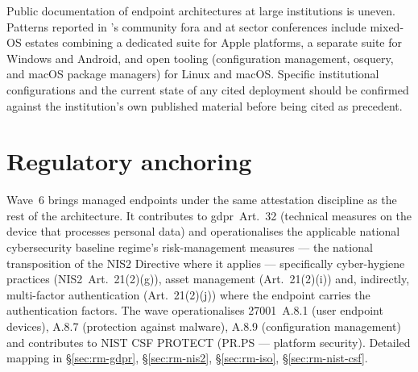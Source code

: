 \begin{realworldbox}
\noindent Public documentation of endpoint architectures at
large institutions is uneven. Patterns reported in 's community fora and at sector
conferences include mixed-OS estates combining a dedicated suite
for Apple platforms, a separate suite for Windows and Android, and
open tooling (configuration management, osquery, and macOS package
managers) for Linux and macOS. Specific institutional
configurations and the current
state of any cited deployment should be confirmed against the
institution's own published material before being cited as
precedent.
\end{realworldbox}

\section{Regulatory anchoring}
\label{sec:w6-regulatory}

\noindent Wave~6 brings managed endpoints under the same
attestation discipline as the rest of the architecture. It
contributes to \gls{gdpr}~Art.~32 (technical measures on the
device that processes personal data) and operationalises the
applicable national cybersecurity baseline regime's risk-management
measures --- the national transposition of the NIS2 Directive where
it applies --- specifically cyber-hygiene practices
(NIS2~Art.~21(2)(g)), asset management (Art.~21(2)(i)) and,
indirectly, multi-factor authentication (Art.~21(2)(j)) where the
endpoint carries the authentication factors. The wave operationalises 27001~A.8.1
(user endpoint devices), A.8.7 (protection against malware),
A.8.9 (configuration management) and contributes to NIST CSF
\textsf{PROTECT} (PR.PS --- platform security). Detailed mapping
in  \S\ref{sec:rm-gdpr},
\S\ref{sec:rm-nis2}, \S\ref{sec:rm-iso},
\S\ref{sec:rm-nist-csf}.
